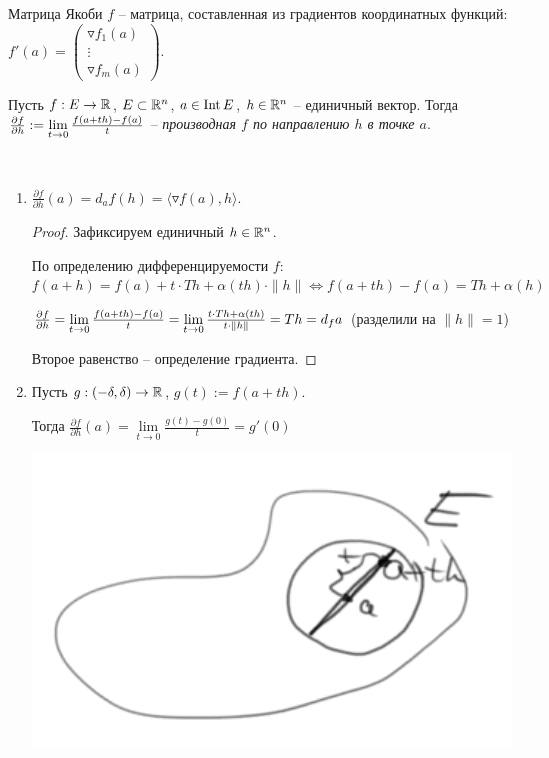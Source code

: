 \begin{corollary}
    Матрица Якоби $f$ – матрица, составленная из градиентов координатных функций: $f'(a)=\begin{pmatrix}
             \triangledown f_1(a) \\ \vdots \\ \triangledown f_m(a)
         \end{pmatrix}$.
\end{corollary}

\begin{definition}
    Пусть $f: E\rightarrow \mathbb{R}$, $E\subset \mathbb{R}^n$, $a\in \operatorname{Int} E$, $h\in \mathbb{R}^n$ – единичный вектор. Тогда $\partialderivative{f}{h}(a):=\lim\limits_{t\rightarrow 0}\frac{f(a+th)-f(a)}{t}$ – \textit{производная $f$ по направлению $h$ в точке $a$}.
\end{definition}

\begin{remark}~
    \begin{enumerate}
        \item $\frac{\partial f}{\partial h}(a)=d_af(h)=\langle\triangledown f(a), h\rangle$.
        \begin{proof}

            Зафиксируем единичный $h\in \mathbb{R}^n$.
            
            По определению дифференцируемости $f$: $f(a+h)=f(a) + t\cdot Th + \alpha (th)\cdot \|h\|\Leftrightarrow f(a+th)-f(a)=Th +\alpha (h)$

            $\partialderivative{f}{h}(a)=\lim\limits_{t\rightarrow 0}\frac{f(a+th)-f(a)}{t} =\lim\limits_{t\rightarrow 0}\frac{t\cdot Th + \alpha (th)}{t\cdot \|h\|}=Th=d_fa$ (разделили на $\|h\|=1$)

            Второе равенство – определение градиента.
        \end{proof}
        \item Пусть $g: (-\delta, \delta)\rightarrow \mathbb{R}$, $g(t):= f(a+th)$. 
        
        Тогда $\frac{\partial f}{\partial h}(a)=\lim\limits_{t\rightarrow 0}\frac{g(t)- g(0)}{t}=g'(0)$

        \includegraphics[width=0.2\linewidth]{images/17-05-1.png}
    \end{enumerate}
\end{remark}

